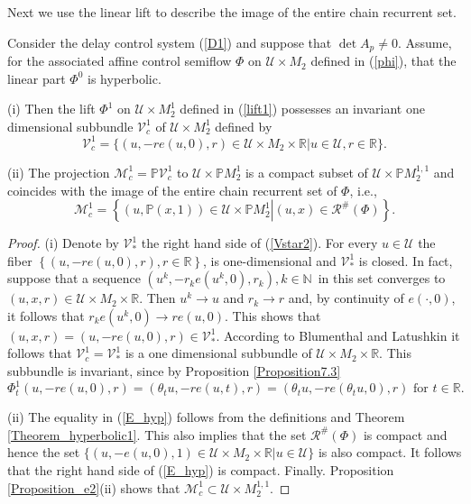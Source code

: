 \documentclass{siamltex}%
\begin{document}
Next we use the linear lift to describe the image of the entire chain
recurrent set.

\begin{theorem}
\label{Theorem_lift}Consider the delay control system (\ref{D1}) and suppose
that $\det A_{p}\not =0$. Assume, for the associated affine control semiflow
$\Phi$ on $\mathcal{U}\times M_{2}$ defined in (\ref{phi}), that the linear
part $\Phi^{0}$ is hyperbolic.

(i) Then the lift $\Phi^{1}$ on $\mathcal{U}\times M_{2}^{1}$ defined in
(\ref{lift1}) possesses an invariant one dimensional subbundle $\mathcal{V}%
_{c}^{1}$ of $\mathcal{U}\times M_{2}^{1}$ defined by%
\begin{equation}
\mathcal{V}_{c}^{1}=\{(u,-re(u,0),r)\in\mathcal{U}\times M_{2}\times
\mathbb{R}\left\vert u\in\mathcal{U},r\in\mathbb{R}\right.  \}. \label{Vstar2}%
\end{equation}


(ii) The projection $\mathcal{M}_{c}^{1}=\mathbb{P}\mathcal{V}_{c}^{1}$ to
$\mathcal{U}\times\mathbb{P}M_{2}^{1}$ is a compact subset of $\mathcal{U}%
\times\mathbb{P}M_{2}^{1,1}$ and coincides with the image of the entire chain
recurrent set of $\Phi$, i.e.,
\begin{equation}
\mathcal{M}_{c}^{1}=\left\{  (u,\mathbb{P}(x,1))\in\mathcal{U}\times
\mathbb{P}M_{2}^{1}\left\vert (u,x)\in\mathcal{R}^{\#}(\Phi)\right.  \right\}
. \label{E_hyp}%
\end{equation}

\end{theorem}

\begin{proof}
(i) Denote by $\mathcal{V}_{\ast}^{1}$ the right hand side of (\ref{Vstar2}).
For every $u\in\mathcal{U}$ the fiber $\left\{  (u,-re(u,0),r),r\in
\mathbb{R}\right\}  $, is one-dimensional and $\mathcal{V}_{\ast}^{1}$ is
closed. In fact, suppose that a sequence $(u^{k},-r_{k}e(u^{k},0),r_{k}%
),k\in\mathbb{N\,}$ in this set converges to $(u,x,r)\in\mathcal{U}\times
M_{2}\times\mathbb{R}$. Then $u^{k}\rightarrow u$ and $r_{k}\rightarrow r$
and, by continuity of $e(\cdot,0)$, it follows that $r_{k}e(u^{k}%
,0)\rightarrow re(u,0)$. This shows that $(u,x,r)=(u,-re(u,0),r)\in
\mathcal{V}_{\ast}^{1}$. According to Blumenthal and Latushkin \cite[Lemma
3.8]{BluL19} it follows that $\mathcal{V}_{c}^{1}=\mathcal{V}_{\ast}^{1}$ is a
one dimensional subbundle of $\mathcal{U}\times M_{2}\times\mathbb{R}$. This
subbundle is invariant, since by Proposition \ref{Proposition7.3}%
\[
\Phi_{t}^{1}(u,-re(u,0),r)=(\theta_{t}u,-re(u,t),r)=(\theta_{t}u,-re(\theta
_{t}u,0),r)\text{ for }t\in\mathbb{R}.
\]


(ii) The equality in (\ref{E_hyp}) follows from the definitions and Theorem
\ref{Theorem_hyperbolic1}. This also implies that the set $\mathcal{R}%
^{\#}(\Phi)$ is compact and hence the set $\{(u,-e(u,0),1)\in\mathcal{U}\times
M_{2}\times\mathbb{R}\left\vert u\in\mathcal{U}\right.  \}$ is also compact.
It follows that the right hand side of (\ref{E_hyp}) is compact. Finally.
Proposition \ref{Proposition_e2}(ii) shows that $\mathcal{M}_{c}^{1}%
\subset\mathcal{U}\times M_{2}^{1,1}$.
\end{proof}
\end{document}
